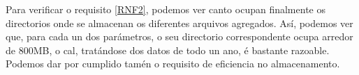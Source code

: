 Para verificar o requisito \hyperref[rnf2]{[RNF2]}, podemos ver canto ocupan finalmente os directorios onde se almacenan os diferentes arquivos agregados. Así, podemos ver que, para cada un dos parámetros,
o seu directorio correspondente ocupa arredor de 800MB, o cal, tratándose dos datos de todo un ano, é bastante razoable. Podemos dar por cumplido tamén o requisito de eficiencia no almacenamento.
